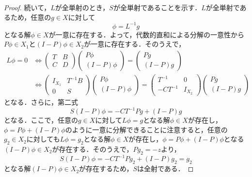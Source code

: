 \documentclass[11pt,a4paper,titlepage]{jsreport}
\theoremstyle{definition}
\begin{document}
\begin{proof}
  続いて，$L$が全単射のとき，$S$が全単射であることを示す．$L$が全単射であるため，任意の$g \in X$に対して
  \begin{equation*}
    \phi = L^{-1}g
  \end{equation*}
  となる解$\phi \in X$が一意に存在する．よって，代数的直和による分解の一意性から$P\phi \in X_1$と$(I-P)\phi \in X_2$が一意に存在する．そのうえで，
  \begin{equation*}
    \begin{split}
      L\phi=0 &\Leftrightarrow
      \begin{pmatrix}
        T & B \\
        C & D
      \end{pmatrix}
      \begin{pmatrix}
        P \phi \\
        (I-P) \phi
      \end{pmatrix}
      =
      \begin{pmatrix}
        Pg \\
        (I-P)g
      \end{pmatrix}
      \\&\Leftrightarrow
      \begin{pmatrix}
        I_{X_1} & T^{-1}B \\
        0 & S
      \end{pmatrix}
      \begin{pmatrix}
        P \phi \\
        (I-P) \phi
      \end{pmatrix}
      =
      \begin{pmatrix}
        T^{-1} & 0 \\
        -CT^{-1} & I_{X_2}
      \end{pmatrix}
      \begin{pmatrix}
        Pg \\
        (I-P)g
      \end{pmatrix}
    \end{split}
  \end{equation*}
  となる．さらに，第二式
  \begin{equation*}
    S(I-P)\phi = -CT^{-1}Pg + (I-P)g
  \end{equation*}
  となる．ここで，任意の$g \in X$に対して$L\phi=g$となる解$\phi \in X$が存在し，$\phi = P\phi + (I-P)\phi$のように一意に分解できることに注意すると，任意の$g_2 \in X_2$に対しても$L\phi=g_2$となる解$\phi \in X$が存在し，$\phi = P\phi + (I-P)\phi$となる$(I-P)\phi \in X_2$が存在する．そのうえで，{\color{red}$P g_2 = -z$}より，
  \begin{equation*}
    S(I-P)\phi = -CT^{-1}Pg_2 + (I-P)g_2=g_2
  \end{equation*}
  となる解$(I-P)\phi \in X_2$が存在するため，$S$は全射である．
\end{proof}
\end{document}

